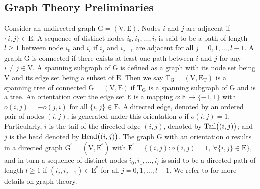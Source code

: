 \documentclass[a4paper, 11pt]{article}
\newcommand{\1}{\mathbf{1}}
\newcommand{\Head}{\textnormal{Head}}
\newcommand{\Tail}{\textnormal{Tail}}
\newcommand{\mG}{\mathrm{G}}
\newcommand{\mV}{\mathrm{V}}
\newcommand{\mE}{\mathrm{E}}
\newcommand{\mT}{\mathrm{T}}
\begin{document}
\subsection{Graph Theory Preliminaries}
Consider an undirected graph $\mG=(\mV,\mE)$.
Nodes $i$ and $j$ are adjacent if $\{i,j\}\in\mE$.
A sequence of distinct nodes $i_0,i_1,\dots,i_l$ is said to be a path of length $l\ge 1$ between node $i_0$ and $i_l$ if $i_j$ and $i_{j+1}$ are adjacent for all $j=0,1,\dots,l-1$.
A graph $\mG$ is  connected if there exists at least one path between $i$ and $j$ for any $i\neq j\in\mV$.
A spanning subgraph of $\mathrm{G}$ is defined as a graph with its node set being $\mV$ and its edge set being a subset of $\mE$. Then we say $\mathrm{T}_{\mG}=(\mathrm{V},\mathrm{E}_{\mT})$ is a spanning tree of connected $\mathrm{G}=(\mathrm{V},\mathrm{E})$ if $\mathrm{T}_{\mG}$ is a spanning subgraph of $\mathrm{G}$ and is a tree. An orientation over the edge set $\mE$ is  a mapping  $o:\mE\to\{-1,1\}$ with $o(i,j)=-o(j,i)$ for all $\{i,j\}\in\mathrm{E}$. A directed edge, denoted by an ordered pair of nodes $(i,j)$, is generated under this orientation $o$ if $o(i,j)=1$. Particularly, $i$ is the tail of the directed edge $(i,j)$, denoted by $\Tail\big((i,j)\big)$; and $j$ is the head denoted by $\Head\big((i,j)\big)$. The graph $\mG$ with an orientation $o$ results in a directed graph $\mG^{^o}=(\mV,\mE^{^o})$ with $\mE^{^o}=\{(i,j):o(i,j)=1,\ \forall\{i,j\}\in\mE\}$, and in turn a sequence of distinct nodes $i_0,i_1,\dots,i_l$ is said to be a directed path of length $l\ge 1$ if $(i_j,i_{j+1})\in\mE^{^o}$ for all $j=0,1,\dots,l-1$. We refer to \cite{godsil2013} for more details on graph theory.
\end{document}
